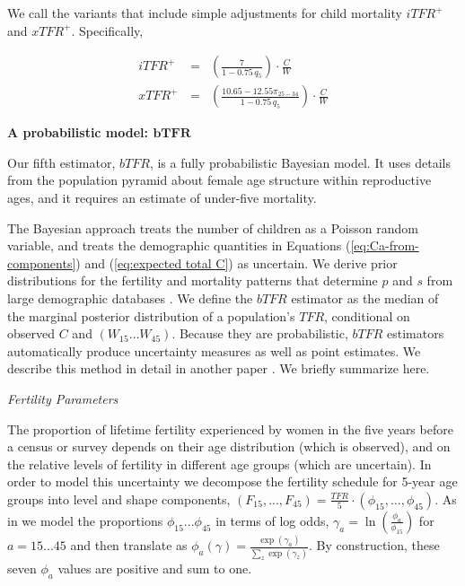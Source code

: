 \documentclass[12pt]{article}
\begin{document}
We call the variants that include simple adjustments for child mortality
\(iTFR^+\) and \(xTFR^+\). Specifically,

\begin{eqnarray}
iTFR^+ \, & = & \left( \frac{7}{1-0.75\,q_5} \right) \cdot \frac{C}{W} \\
xTFR^+\, & = & \left( \frac{10.65 -12.55 \pi_{25-34}}{1-0.75\,q_5} \right) \cdot  \frac{C}{W}
\end{eqnarray}

\textbf{A probabilistic model: \(\mathbf{bTFR}\)}

Our fifth estimator, \(bTFR\), is a fully probabilistic Bayesian model.
It uses details from the population pyramid about female age structure
within reproductive ages, and it requires an estimate of under-five
mortality.

The Bayesian approach treats the number of children as a Poisson random
variable, and treats the demographic quantities in Equations
(\ref{eq:Ca-from-components}) and (\ref{eq:expected total C}) as
uncertain. We derive prior distributions for the fertility and mortality
patterns that determine \(p\) and \(s\) from large demographic databases
\citep{HFD, HMD}. We define the \(bTFR\) estimator as the median of the
marginal posterior distribution of a population's \(TFR\), conditional
on observed \(C\) and \((W_{15}\ldots W_{45})\). Because they are
probabilistic, \(bTFR\) estimators automatically produce uncertainty
measures as well as point estimates. We describe this method in detail
in another paper \citep{schmertmann2019bayesian}. We briefly summarize
here.

\emph{Fertility Parameters}

The proportion of lifetime fertility experienced by women in the five
years before a census or survey depends on their age distribution (which
is observed), and on the relative levels of fertility in different age
groups (which are uncertain). In order to model this uncertainty we
decompose the fertility schedule for 5-year age groups into level and
shape components,
\((F_{15},...,F_{45})= \frac{TFR}{5} \cdot (\phi_{15},...,\phi_{45})\).
As in \citep{schmertmann2019bayesian} we model the proportions
\(\phi_{15}...\phi_{45}\) in terms of log odds,
\(\gamma_{a}=\ln(\frac{\phi_a}{\phi_{15}})\) for \(a=15...45\) and then
translate as
\(\phi_a(\gamma)= \frac{\exp(\gamma_{a})}{\sum_{z}\exp(\gamma_{z})}\).
By construction, these seven \(\phi_a\) values are positive and sum to
one.
\end{document}
